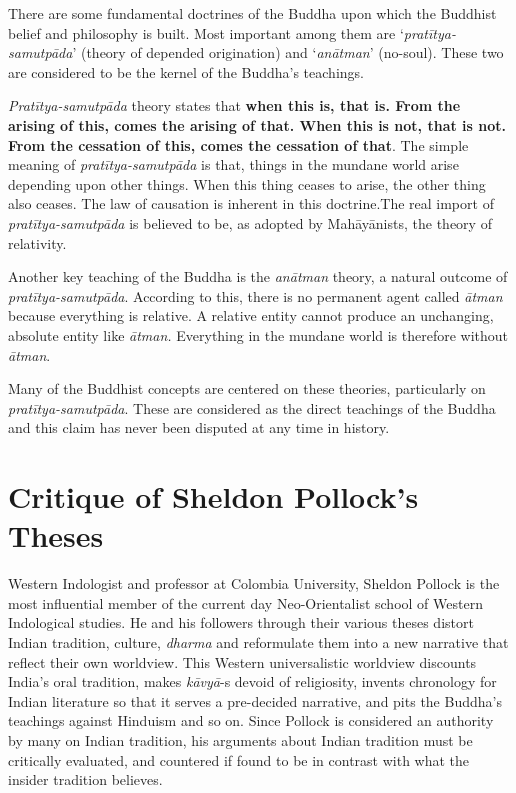 There are some fundamental doctrines of the Buddha upon which the Buddhist belief and philosophy is built. Most important among them are ‘\textit{pratītya-samutpāda}’ (theory of depended origination) and ‘\textit{anātman}’ (no-soul). These two are considered to be the kernel of the Buddha’s teachings.

\textit{Pratītya-samutpāda} theory states that \textbf{when this is, that is. From the arising of this, comes the arising of that. When this is not, that is not. From the cessation of this, comes the cessation of that}. The simple meaning of \textit{pratītya-samutpāda} is that, things in the mundane world arise depending upon other things. When this thing ceases to arise, the other thing also ceases. The law of causation is inherent in this doctrine.The real import of \textit{pratītya-samutpāda} is believed to be, as adopted by Mahāyānists, the theory of relativity.

Another key teaching of the Buddha is the \textit{anātman} theory, a natural outcome of \textit{pratītya-samutpāda}. According to this, there is no permanent agent called \textit{ātman} because everything is relative. A relative entity cannot produce an unchanging, absolute entity like \textit{ātman.} Everything in the mundane world is therefore without \textit{ātman}.

Many of the Buddhist concepts are centered on these theories, particularly on \textit{pratītya-samutpāda}. These are considered as the direct teachings of the Buddha and this claim has never been disputed at any time in history.

\vspace{-.3cm}

\section*{Critique of Sheldon Pollock's Theses}

Western Indologist and professor at Colombia University, Sheldon Pollock is the most influential member of the current day Neo-Orientalist school of Western Indological studies. He and his followers through their various theses distort Indian tradition, culture, \textit{dharma} and reformulate them into a new narrative that reflect their own worldview. This Western universalistic worldview discounts India’s oral tradition, makes \textit{kāvyā}-s devoid of religiosity, invents chronology for Indian literature so that it serves a pre-decided narrative, and pits the Buddha’s teachings against Hinduism and so on. Since Pollock is considered an authority by many on Indian tradition, his arguments about Indian tradition must be critically evaluated, and countered if found to be in contrast with what the insider tradition believes.

